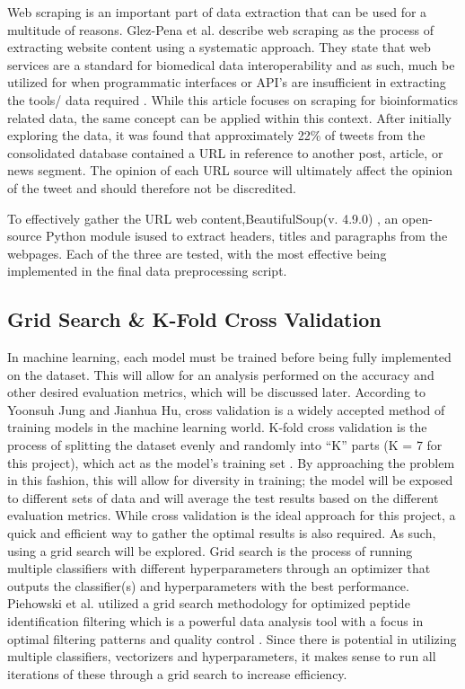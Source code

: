 \documentclass[12pt]{article}
\begin{document}
Web scraping is an important part of data extraction that can be used for a multitude of reasons.  Glez-Pena et al. describe web scraping as the process of extracting website content using a systematic approach. They state that web services are a standard for biomedical data interoperability and as such, much be utilized for when programmatic interfaces or API’s are insufficient in extracting the tools/ data required \cite{glez-pena-etal-2013}.  While this article focuses on scraping for bioinformatics related data, the same concept can be applied within this context.  After initially exploring the data, it was found that approximately 22\% of tweets from the consolidated database contained a URL in reference to another post, article, or news segment.  The opinion of each URL source will ultimately affect the opinion of the tweet and should therefore not be discredited.


To effectively gather the URL web content,BeautifulSoup(v. 4.9.0) \cite{crummy-2020}, an open-source Python module isused to extract headers, titles and paragraphs from the webpages. Each of the three are tested, with the most effective being implemented in the final data preprocessing script.   



\subsection{Grid Search \& K-Fold Cross Validation}
In machine learning, each model must be trained before being fully implemented on the dataset.  This will allow for an analysis performed on the accuracy and other desired evaluation metrics, which will be discussed later.  According to Yoonsuh Jung and Jianhua Hu, cross validation is a widely accepted method of training models in the machine learning world.  K-fold cross validation is the process of splitting the dataset evenly and randomly into “K” parts (K = 7 for this project), which act as the model’s training set \cite{jung-2014}.  By approaching the problem in this fashion, this will allow for diversity in training; the model will be exposed to different sets of data and will average the test results based on the different evaluation metrics.
While cross validation is the ideal approach for this project, a quick and efficient way to gather the optimal results is also required.  As such, using a grid search will be explored.  Grid search is the process of running multiple classifiers with different hyperparameters through an optimizer that outputs the classifier(s) and hyperparameters with the best performance. Piehowski et al. utilized a grid search methodology for optimized peptide identification filtering which is a powerful data analysis tool with a focus in optimal filtering patterns and quality control \cite{piehowski-etal-2013}.  Since there is potential in utilizing multiple classifiers, vectorizers and hyperparameters, it makes sense to run all iterations of these through a grid search to increase efficiency.
\end{document}
